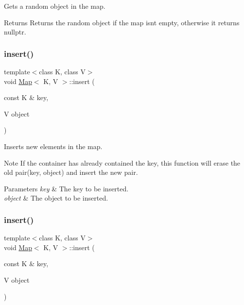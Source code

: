 Gets a random object in the map. \begin{DoxyReturn}{Returns}
Returns the random object if the map isn\textquotesingle{}t empty, otherwise it returns nullptr. 
\end{DoxyReturn}
\mbox{\label{classMap_a79ec6300dee7b2a177fab408e9c72506}} 
\subsubsection{\texorpdfstring{insert()}{insert()}\hspace{0.1cm}{\footnotesize\ttfamily [1/2]}}
{\footnotesize\ttfamily template$<$class K, class V$>$ \\
void \hyperlink{classMap}{Map}$<$ K, V $>$\+::insert (\begin{DoxyParamCaption}\item[{const K \&}]{key,  }\item[{V}]{object }\end{DoxyParamCaption})\hspace{0.3cm}{\ttfamily [inline]}}

Inserts new elements in the map.

\begin{DoxyNote}{Note}
If the container has already contained the key, this function will erase the old pair(key, object) and insert the new pair. 
\end{DoxyNote}

\begin{DoxyParams}{Parameters}
{\em key} & The key to be inserted. \\
\hline
{\em object} & The object to be inserted. \\
\hline
\end{DoxyParams}
\mbox{\label{classMap_a79ec6300dee7b2a177fab408e9c72506}} 
\subsubsection{\texorpdfstring{insert()}{insert()}\hspace{0.1cm}{\footnotesize\ttfamily [2/2]}}
{\footnotesize\ttfamily template$<$class K, class V$>$ \\
void \hyperlink{classMap}{Map}$<$ K, V $>$\+::insert (\begin{DoxyParamCaption}\item[{const K \&}]{key,  }\item[{V}]{object }\end{DoxyParamCaption})\hspace{0.3cm}{\ttfamily [inline]}}

